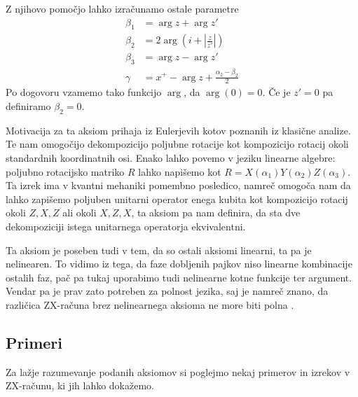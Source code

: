 \documentclass[mat1]{fmfdelo}
\begin{document}
Z njihovo pomočjo lahko izračunamo ostale parametre
\begin{align*}
    \beta_1 &= \arg z + \arg z'\\
    \beta_2 &= 2\arg\left(i+\left\lvert\frac{z}{z'}\right\rvert\right)\\
    \beta_3 &= \arg z - \arg z'\\
    \gamma &= x^+-\arg z + \frac{\alpha_2-\beta_2}{2}
\end{align*}
Po dogovoru vzamemo tako funkcijo \(\arg\), da \(\arg(0)=0\). Če je \(z'=0\) pa definiramo \(\beta_2 = 0\).

Motivacija za ta aksiom prihaja iz Eulerjevih kotov poznanih iz klasične analize. Te nam omogočijo dekompozicijo poljubne rotacije kot kompozicijo rotacij okoli standardnih koordinatnih osi. Enako lahko povemo v jeziku linearne algebre: poljubno rotacijsko matriko \(R\) lahko napišemo kot \(R=X(\alpha_1)Y(\alpha_2)Z(\alpha_3)\). Ta izrek ima v kvantni mehaniki pomembno posledico, namreč omogoča nam da lahko zapišemo poljuben unitarni operator enega kubita kot kompozicijo rotacij okoli \(Z,X,Z\) ali okoli \(X,Z,X\), ta aksiom pa nam definira, da sta dve dekompoziciji istega unitarnega operatorja ekvivalentni.

Ta aksiom je poseben tudi v tem, da so ostali aksiomi linearni, ta pa je nelinearen. To vidimo iz tega, da faze dobljenih pajkov niso linearne kombinacije ostalih faz, pač pa tukaj uporabimo tudi nelinearne kotne funkcije ter argument. Vendar pa je prav zato potreben za polnost jezika, saj je namreč znano, da različica ZX-računa brez nelinearnega aksioma ne more biti polna \cite[izrek 6.1]{jeandeldiagrammatic}.

\subsection{Primeri}
Za lažje razumevanje podanih aksiomov si poglejmo nekaj primerov in izrekov v ZX-računu, ki jih lahko dokažemo.
\end{document}
